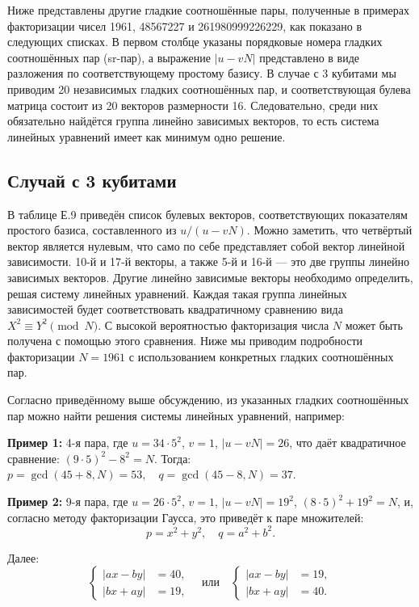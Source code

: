 
Ниже представлены другие гладкие соотношённые пары, полученные в примерах
факторизации чисел 1961, 48567227 и 261980999226229, как показано в следующих
списках. В первом столбце указаны порядковые номера гладких соотношённых пар
(sr-пар), а выражение $|u - vN|$ представлено в виде разложения по
соответствующему простому базису. В случае с 3 кубитами мы приводим 20
независимых гладких соотношённых пар, и соответствующая булева матрица состоит
из 20 векторов размерности 16. Следовательно, среди них обязательно найдётся
группа линейно зависимых векторов, то есть система линейных уравнений имеет как
минимум одно решение.

\subsection*{Случай с 3 кубитами}

В таблице Е.9 приведён список булевых векторов, соответствующих показателям
простого базиса, составленного из $u / (u - vN)$. Можно заметить, что четвёртый
вектор является нулевым, что само по себе представляет собой вектор линейной
зависимости. 10-й и 17-й векторы, а также 5-й и 16-й — это две группы линейно
зависимых векторов. Другие линейно зависимые векторы необходимо определить,
решая систему линейных уравнений. Каждая такая группа линейных зависимостей
будет соответствовать квадратичному сравнению вида $X^2 \equiv Y^2 \pmod{N}$. С
высокой вероятностью факторизация числа $N$ может быть получена с помощью этого
сравнения. Ниже мы приводим подробности факторизации $N = 1961$ с
использованием конкретных гладких соотношённых пар.

Согласно приведённому выше обсуждению, из указанных гладких соотношённых пар
можно найти решения системы линейных уравнений, например:

\textbf{Пример 1:} 4-я пара, где $u = 34 \cdot 5^2$, $v = 1$, $|u - vN| = 26$,
что даёт квадратичное сравнение: $(9 \cdot 5)^2 - 8^2 = N$. Тогда: $p = \gcd(45
+ 8, N) = 53, \quad q = \gcd(45 - 8, N) = 37$.

\textbf{Пример 2:} 9-я пара, где $u = 26 \cdot 5^2$, $v = 1$, $|u - vN| =
19^2$, $(8 \cdot 5)^2 + 19^2 = N$, и, согласно методу факторизации Гаусса, это
приведёт к паре множителей:
\begin{equation}
p = x^2 + y^2, \quad q = a^2 + b^2.
\end{equation}

Далее:
\begin{equation}
\left\{
\begin{aligned}
|ax - by| &= 40,\\
|bx + ay| &= 19,
\end{aligned}
\right.
\quad \text{или} \quad
\left\{
\begin{aligned}
|ax - by| &= 19,\\
|bx + ay| &= 40.
\end{aligned}
\right.
\end{equation}

